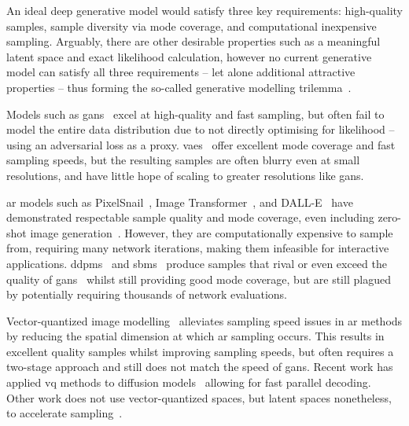 An ideal deep generative model would satisfy three key requirements:
high-quality samples, sample diversity via mode coverage, and computational
inexpensive sampling. Arguably, there are other desirable properties such as a
meaningful latent space and exact likelihood calculation, however no current
generative model can satisfy all three requirements -- let alone additional
attractive properties -- thus forming the so-called generative modelling
trilemma~\cite{xiao2021trilemma}.

Models such as \glspl{gan}~\cite{goodfellow2014gan}
excel at high-quality and fast sampling, but often fail to model the entire data
distribution due to not directly optimising for likelihood -- using an
adversarial loss as a proxy. \Glspl{vae}~\cite{kingma2013vae} offer
excellent mode coverage and fast sampling speeds, but the resulting samples are
often blurry even at small resolutions, and have little hope of scaling to
greater resolutions like \glspl{gan}.

\Gls{ar} models such as PixelSnail~\cite{chen2017snail}, Image
Transformer~\cite{parmar2018image}, and DALL-E~\cite{parmar2018image} have
demonstrated respectable sample quality and mode coverage, even including
zero-shot image generation~\cite{ramesh2021dalle}. However, they are
computationally expensive to sample from, requiring many network iterations,
making them infeasible for interactive applications. \Glspl{ddpm}~\cite{ho2020ddpm}
and \glspl{sbm}~\cite{song2019sbm,song2020sde,song2021mlt} produce
samples that rival or even exceed the quality of \glspl{gan}~\cite{dhariwal2021ddpm}
whilst still providing good mode coverage, but are still plagued by potentially
requiring thousands of network evaluations.

Vector-quantized image
modelling~\cite{oord2017vqvae,razavi2019generating,esser2021taming} alleviates
sampling speed issues in \gls{ar} methods by reducing the spatial dimension at
which \gls{ar} sampling occurs. This results in excellent quality samples whilst
improving sampling speeds, but often requires a two-stage approach and still
does not match the speed of \glspl{gan}. Recent work has applied \gls{vq}
methods to diffusion models~\cite{bondtaylor2021unleashing} allowing for fast
parallel decoding. Other work does not use vector-quantized spaces, but latent
spaces nonetheless, to accelerate
sampling~\cite{xiao2021trilemma,vahdat2021sbmlatent}.

